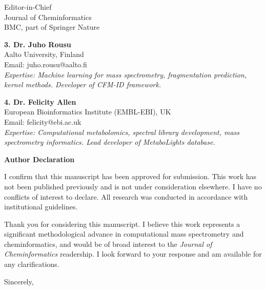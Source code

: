 \documentclass[11pt,letterpaper]{letter}
\begin{document}
\begin{letter}{
    Editor-in-Chief \\
    Journal of Cheminformatics \\
    BMC, part of Springer Nature
}
\vspace{0.2cm}

\textbf{3. Dr. Juho Rousu} \\
Aalto University, Finland \\
Email: juho.rousu@aalto.fi \\
\textit{Expertise: Machine learning for mass spectrometry, fragmentation prediction, kernel methods. Developer of CFM-ID framework.}

\vspace{0.2cm}

\textbf{4. Dr. Felicity Allen} \\
European Bioinformatics Institute (EMBL-EBI), UK \\
Email: felicity@ebi.ac.uk \\
\textit{Expertise: Computational metabolomics, spectral library development, mass spectrometry informatics. Lead developer of MetaboLights database.}

\vspace{0.3cm}

\textbf{Author Declaration}

\vspace{0.2cm}

I confirm that this manuscript has been approved for submission. This work has not been published previously and is not under consideration elsewhere. I have no conflicts of interest to declare. All research was conducted in accordance with institutional guidelines.

\vspace{0.3cm}

Thank you for considering this manuscript. I believe this work represents a significant methodological advance in computational mass spectrometry and cheminformatics, and would be of broad interest to the \textit{Journal of Cheminformatics} readership. I look forward to your response and am available for any clarifications.

\closing{Sincerely,}

\end{letter}
\end{document}
